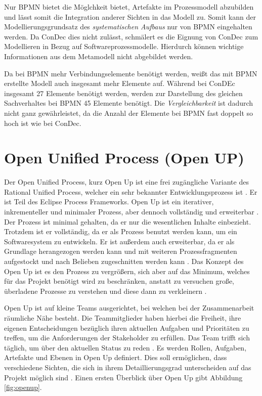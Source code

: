 Nur BPMN bietet die Möglchkeit bietet, Artefakte im Prozessmodell abzubilden und lässt somit die Integration anderer Sichten in das Modell zu. Somit kann der Modellierungsgrundsatz des \textit{systematischen Aufbaus} nur von BPMN eingehalten werden. Da ConDec dies nicht zulässt, schmälert es die Eignung von ConDec zum Modellieren in Bezug auf Softwareprozessmodelle. Hierdurch können wichtige Informationen aus dem Metamodell nicht abgebildet werden. \newline 

Da bei BPMN mehr Verbindungselemente benötigt werden, weißt das mit BPMN erstellte Modell auch insgesamt mehr Elemente auf. Während bei ConDEc insgesamt 27 Elemente benötigt werden, werden zur Darstellung des gleichen Sachverhaltes bei BPMN 45 Elemente benötigt. Die \textit{Vergleichbarkeit} ist dadurch nicht ganz gewährleistet, da die Anzahl der Elemente bei BPMN fast doppelt so hoch ist wie bei ConDec.





\section{Open Unified Process (Open UP)}


Der Open Unified Process, kurz Open Up ist eine frei zugängliche Variante des Rational Unified Process, welcher ein sehr bekannter Entwicklungsprozess ist \cite{hauber2010}.  Er ist Teil des Eclipse Process Frameworks. Open Up ist ein iterativer, inkrementeller und minimaler Prozess, aber dennoch vollständig und erweiterbar \cite{Gau2006, Basem2010}. Der Prozess ist minimal gehalten, da er nur die wesentlichen Inhalte einbezieht. Trotzdem ist er vollständig, da er als Prozess benutzt werden kann, um ein Softwaresystem zu entwickeln. Er ist außerdem auch erweiterbar, da er als Grundlage herangezogen werden kann und mit weiteren Prozessfragmenten aufgestockt und nach Belieben zugeschnitten werden kann \cite{Wang2007}. Das Konzept des Open Up ist es den Prozess zu vergrößern, sich aber auf das Minimum, welches für das Projekt benötigt wird zu beschränken, anstatt zu versuchen große, überladene Prozesse zu verstehen und diese dann zu verkleinern \cite{ambler2012}.  \newline



Open Up ist auf kleine Teams ausgerichtet, bei welchen bei der Zusammenarbeit räumliche Nähe besteht. Die Teammitglieder haben hierbei die Freiheit, ihre eigenen Entscheidungen bezüglich ihren aktuellen Aufgaben und Prioritäten zu treffen, um die Anforderungen der Stakeholder zu erfüllen. Das Team trifft sich täglich, um über den aktuellen Status zu reden \cite{OpenUPProcess}.\newline
Es werden Rollen, Aufgaben, Artefakte und Ebenen in Open Up definiert. Dies soll ermöglichen, dass verschiedene Sichten, die sich in ihrem Detaillierungsgrad unterscheiden auf das Projekt möglich sind \cite{freudenreichevaluierung}. Einen ersten Überblick über Open Up gibt Abbildung \ref{fig:openup}.


